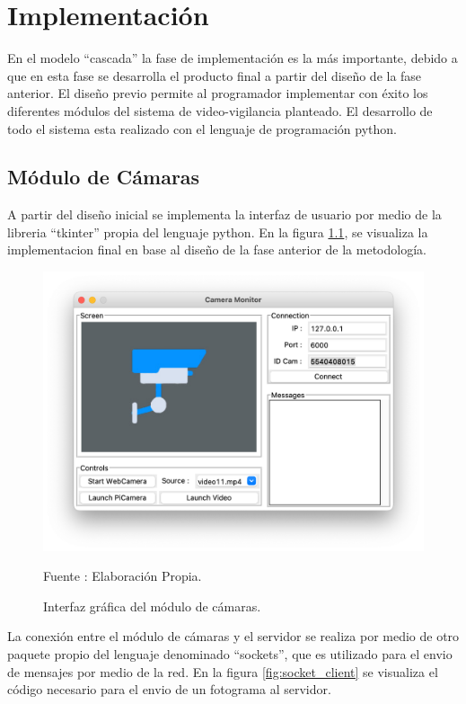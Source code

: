 \chapter{Implementación}
En el modelo ``cascada'' la fase de implementación es la más importante, debido a que en esta fase se desarrolla el producto final a partir del diseño de la fase anterior. El diseño previo permite al programador implementar con éxito los diferentes módulos del sistema de video-vigilancia planteado. El desarrollo de todo el sistema esta realizado con el lenguaje de programación python.

\section{Módulo de Cámaras}
A partir del diseño inicial se implementa la interfaz de usuario por medio de la libreria ``tkinter'' propia del lenguaje python. En la figura \ref{fig:camera_screen}, se visualiza la implementacion final en base al diseño de la fase anterior de la metodología.
\begin{figure}[H]
    \begin{center}
        \includegraphics[width=13cm]{img/capitulo_5/camera_interface.png}
        \caption{Interfaz gráfica del módulo de cámaras.}
        Fuente : Elaboración Propia.
        \label{fig:camera_screen}
    \end{center}
\end{figure}

La conexión entre el módulo de cámaras y el servidor se realiza por medio de otro paquete propio del lenguaje denominado ``sockets'', que es utilizado para el envio de mensajes por medio de la red. En la figura \ref{fig:socket_client} se visualiza el código necesario para el envio de un fotograma al servidor.


